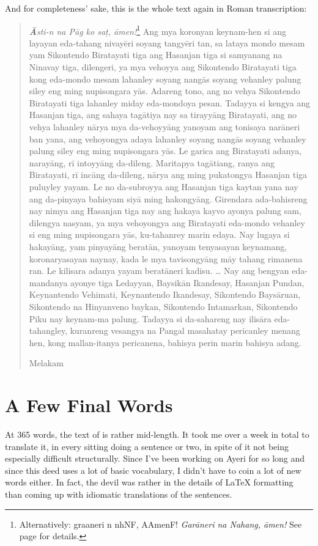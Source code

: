\documentclass[12pt,paper=a4]{scrartcl}
\newcommand{\fw}[1]{\textit{#1}} %
\newcommand{\ayr}[1]{{\Tagati #1}}
\begin{document}
And for completeness' sake, this is the whole text again in Roman transcription:

\blockquote{
	\fw{\textbf{Ā}sti-n na Pāg ko saț, āmen!}\footnote{Alternatively:
		\ayr{graaneri n nhNF, AAmenF!} \fw{Garāneri na Nahang, āmen!}
		See page \pageref{ex:innomine} for details.} %
	Ang mya koronyan keynam-hen si ang layayan eda-tahang nivayēri soyang 
		tangyēri tan, sa lataya mondo mesam yam Sikontendo Biratayati 
		tiga ang Hasanjan tiga si samyanang na Nina\-vay tiga, 
		dilengeri, ya mya vehoyya ang Sikontendo Biratayati tiga kong 
		eda-mondo mesam lahanley soyang nangās soyang vehanley palung 
		siley eng ming nupisongara yās. %
	Adareng tono, ang no vehya Sikontendo Birata\-yati tiga lahanley miday 
		eda-mondoya pesan. %
	Tadayya si kengya ang Hasanjan tiga, ang sahaya tagātiya nay sa 
		tirayyāng Birata\-yati, ang no vehya lahanley nārya mya 
		da-vehoyyāng yanoyam ang tonisaya narāneri ban yana, ang 
		vehoyongya adaya lahanley soyang nangās soyang vehanley palung 
		siley eng ming nupisongara yās. %
	Le garica ang Biratayati adanya, narayāng, rī intoyyāng da-dileng. %
	Maritapya tagātiang, ranya ang Biratayati, rī incāng da-dileng, 
		nārya ang ming pukatongya Hasanjan tiga puluyley yayam. %
	Le no da-subroyya ang Hasanjan tiga kaytan yana nay ang da-pinyaya 
		bahisyam siyā ming hakongyāng. %
	Girendara ada-bahisreng nay nimya ang Hasanjan tiga nay ang hakaya kayvo 
		ayonya palung sam, dilengya nasyam, ya mya vehoyongya ang 
		Biratayati eda-mondo vehanley si eng ming nupisongara yās, 
		ku-tahanrey marin edaya. %
	Nay lugaya si hakayāng, yam pinyayāng beratān, yanoyam 
		tenyasayan keynamang, koronaryasayan naynay, kada le mya 
		tavisongyāng māy tahang rimanena ran. %
	Le kilisara adanya yayam beratāneri kadisu. %
	… %
	Nay ang bengyan eda-mandanya ayonye tiga Ledayyan, Baysikān Ikandesay, 
		Hasanjan Pundan, Keynantendo Vehimati, Keynantendo Ikandesay, 
		Sikontendo Baysāruan, Sikontendo na Hinyanveno baykan, 
		Sikontendo Intamarkan, Sikontendo Piku nay keynam-ma palung. %
	Tadayya si da-sahareng nay ilisāra eda-tahangley, kuranreng vesangya na 
		Pangal masahatay pericanley menang hen, kong mallan-itanya 
		pericanena, bahisya perin marin bahisya adang. %
	\begin{center}
		Melakam
	\end{center}
}

\section{A Few Final Words}
At 365 words, the text of  is rather mid-length. It took 
me over a week in total to translate it, in every sitting doing a sentence or 
two, in spite of it not being especially difficult structurally. Since I've been 
working on Ayeri for so long and since this deed uses a lot of basic vocabulary, 
I didn't have to coin a lot of new words either. In fact, the devil was rather 
in the details of \LaTeX{} formatting than coming up with idiomatic translations 
of the sentences.
\end{document}
